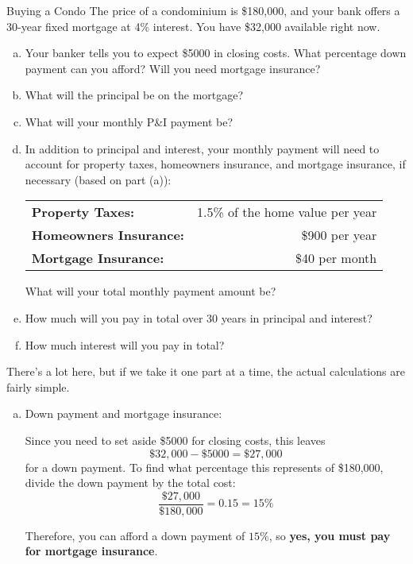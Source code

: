 \begin{example}[https://www.youtube.com/watch?v=B0SeINL8R0g&list=PLfmpjsIzhztsZtnb7HnXrQ8SLoiOCIcAM&index=37]{Buying a Condo}
The price of a condominium is \$180,000, and your bank offers a 30-year fixed mortgage at 4\% interest.  You have \$32,000 available right now.
\begin{enumerate}[(a)]
\item Your banker tells you to expect \$5000 in closing costs.  What percentage down payment can you afford?  Will you need mortgage insurance?
\item What will the principal be on the mortgage?
\item What will your monthly P\&I payment be?
\item In addition to principal and interest, your monthly payment will need to account for property taxes, homeowners insurance, and mortgage insurance, if necessary (based on part (a)):
\begin{center}
\begin{tabular}{l r}
\textbf{Property Taxes:} & 1.5\% of the home value per year\\
\textbf{Homeowners Insurance:} & \$900 per year\\
\textbf{Mortgage Insurance:} & \$40 per month
\end{tabular}
\end{center}
What will your total monthly payment amount be?
\item How much will you pay in total over 30 years in principal and interest?
\item How much interest will you pay in total?
\end{enumerate}

\sol
There's a lot here, but if we take it one part at a time, the actual calculations are fairly simple.

\begin{enumerate}[(a)]
\item Down payment and mortgage insurance:

Since you need to set aside \$5000 for closing costs, this leaves \[\$32,000 - \$5000 = \$27,000\] for a down payment.  To find what percentage this represents of \$180,000, divide the down payment by the total cost:
\[\dfrac{\$27,000}{\$180,000} = 0.15 = 15\%\]

Therefore, you can afford a down payment of $\boxed{15\%}$, so \textbf{yes, you must pay for mortgage insurance}.


\end{enumerate}
\end{example}
